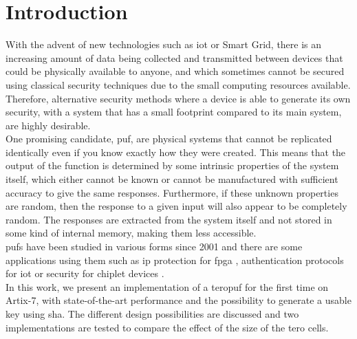 \chapter{Introduction}

With the advent of new technologies such as \acrfull{iot} or Smart Grid, there is an increasing amount of data being collected and transmitted between devices that could be physically available to anyone, and which sometimes cannot be secured using classical security techniques due to the small computing resources available. Therefore, alternative security methods where a device is able to generate its own security, with a system that has a small footprint compared to its main system, are highly desirable.\\

One promising candidate, \acrshort{puf}, are physical systems that cannot be replicated identically even if you know exactly how they were created. This means that the output of the function is determined by some intrinsic properties of the system itself, which either cannot be known or cannot be manufactured with sufficient accuracy to give the same responses. Furthermore, if these unknown properties are random, then the response to a given input will also appear to be completely random. The responses are extracted from the system itself and not stored in some kind of internal memory, making them less accessible.\\

\acrshort{puf}s have been studied in various forms since 2001 \cite{pappu_physical_2001} and there are some applications using them such as \acrfull{ip} protection for \acrshort{fpga} \cite{paillier_fpga_2007}, authentication protocols for \acrshort{iot} \cite{al-meer_physical_2022, ebrahimabadi_attack_2022, bendavid_iot_2018} or security for chiplet devices \cite{deric_know_2022}.\\

In this work, we present an implementation of a \acrfull{teropuf} for the first time on Artix-7, with state-of-the-art performance and the possibility to generate a usable key using \acrshort{sha}. The different design possibilities are discussed and two implementations are tested to compare the effect of the size of the \acrshort{tero} cells.






